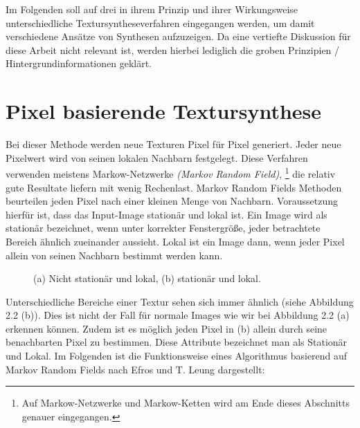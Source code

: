 \documentclass[12pt, a4paper,twoside,openright]{report} %
\begin{document}
Im Folgenden soll auf drei in ihrem Prinzip und ihrer Wirkungsweise unterschiedliche Textursyntheseverfahren eingegangen werden,
um damit verschiedene Ansätze von Synthesen aufzuzeigen.
Da eine vertiefte Diskussion für diese Arbeit nicht relevant ist, werden hierbei lediglich die groben Prinzipien / Hintergrundinformationen geklärt.

\section{Pixel basierende Textursynthese}

Bei dieser Methode werden neue Texturen Pixel für Pixel generiert.
Jeder neue Pixelwert wird von seinen lokalen Nachbarn festgelegt.
Diese Verfahren verwenden meistens Markow-Netzwerke \textit{(Markov Random Field)},
\footnote[1]{Auf Markow-Netzwerke und Markow-Ketten wird am Ende dieses Abschnitts genauer eingegangen.}
die relativ gute Resultate liefern mit wenig Rechenlast.
Markov Random Fields Methoden beurteilen jeden Pixel nach einer kleinen Menge von Nachbarn.
Voraussetzung hierfür ist, dass das Input-Image stationär und lokal ist.
Ein Image wird als stationär bezeichnet, wenn unter korrekter Fenstergröße,
jeder betrachtete Bereich ähnlich zueinander aussieht.
Lokal ist ein Image dann, wenn jeder Pixel allein von seinen Nachbarn bestimmt werden kann. \cite{GomathiShah2009}

\begin{figure}[H]
    \centering
    \qquad
    \caption{(a) Nicht stationär und lokal, (b) stationär und lokal.}%
\end{figure}

Unterschiedliche Bereiche einer Textur sehen sich immer ähnlich {(siehe Abbildung 2.2 (b))}.
Dies ist nicht der Fall für normale Images wie wir bei Abbildung 2.2 {(a)} erkennen können.
Zudem ist es möglich jeden Pixel in {(b)} allein durch seine benachbarten Pixel zu bestimmen.
Diese Attribute bezeichnet man als Stationär und Lokal. \cite{GomathiShah2009}
Im Folgenden ist die Funktionsweise eines Algorithmus basierend auf Markov Random Fields nach Efros und T. Leung dargestellt: \cite{Efros99}
\end{document}

